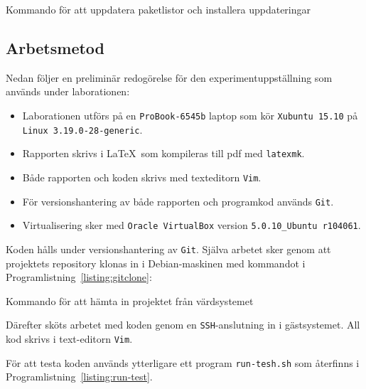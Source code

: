\begin{listing}[H]
\caption{Kommando för att uppdatera paketlistor och installera uppdateringar}
\label{listing:apt-update}
\end{listing}



\subsection{Arbetsmetod}

Nedan följer en preliminär redogörelse för den experimentuppställning som används
under laborationen:

\begin{itemize}
  \item Laborationen utförs på en \texttt{ProBook-6545b} laptop som kör
        \texttt{Xubuntu 15.10} på \texttt{Linux 3.19.0-28-generic}.

  \item Rapporten skrivs i \LaTeX\  som kompileras till pdf med \texttt{latexmk}.

  \item Både rapporten och koden skrivs med texteditorn \texttt{Vim}.

  \item För versionshantering av både rapporten och programkod används \texttt{Git}.

  \item Virtualisering sker med \texttt{Oracle VirtualBox} version
        \texttt{5.0.10\_Ubuntu r104061}.
\end{itemize}

Koden hålls under versionshantering av \texttt{Git}. Själva arbetet sker genom
att projektets repository klonas in i Debian-maskinen med kommandot i
Programlistning~\ref{listing:gitclone}:

\begin{listing}[H]
\caption{Kommando för att hämta in projektet från värdsystemet}
\label{listing:gitclone}
\end{listing}

Därefter sköts arbetet med koden genom en \texttt{SSH}-anslutning in i
gästsystemet.  All kod skrivs i text-editorn \texttt{Vim}. 

För att testa koden används ytterligare ett program \texttt{run-tesh.sh} som
återfinns i Programlistning~\ref{listing:run-test}.

